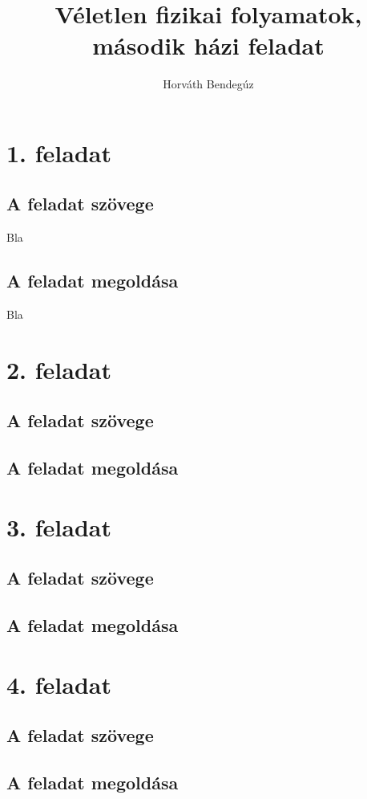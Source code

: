 \documentclass[12pt]{article}
\title{Véletlen fizikai folyamatok, második házi feladat}
\author{Horváth Bendegúz}
\begin{document}
\maketitle
\section*{1. feladat}
\subsection*{ A feladat szövege} Bla
 
\subsection*{A feladat megoldása} Bla
 
\newpage
\section*{2. feladat}
\subsection*{ A feladat szövege}
 
 \subsection*{A feladat megoldása}


\newpage

\section*{3. feladat} 
\subsection*{ A feladat szövege}
 
 \subsection*{A feladat megoldása}

\newpage
\section*{4. feladat}
\subsection*{ A feladat szövege}
 
 \subsection*{A feladat megoldása}
\end{document}
